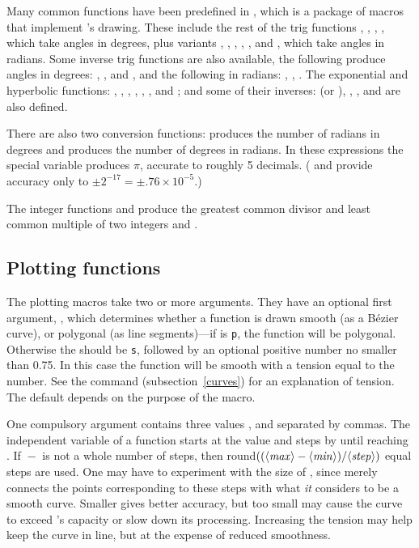 \documentclass[letterpaper]{article}
\begin{document}
Many common functions have been predefined in , which is
a package of \MF{} macros that implement 's drawing. These
include the rest of the trig functions , , ,
, which take angles in degrees, plus variants ,
, , , , and , which take
angles in radians. Some inverse trig functions are also available, the
following produce angles in degrees: , , and
, and the following in radians: , ,
. The exponential and hyperbolic functions: ,
, , , , , and
; and some of their inverses:  (or ),
, , and  are also defined.

There are also two conversion functions:  produces the
number of radians in  degrees and  produces the
number of degrees in  radians. In these expressions the special
variable  produces $\pi$, accurate to roughly 5 decimals.
(\CMF{} and \MP{} provide accuracy only to $\pm2^{-17} = \pm
.76\times10^{-5}$.)

The integer functions  and  produce the
greatest common divisor and least common multiple of two integers
 and .


\subsection{Plotting functions}\label{plotting}

The plotting macros take two or more arguments. They have an optional
first argument, , which determines whether a function is
drawn smooth (as a \MF{} B\'ezier curve), or polygonal (as line
segments)---if  is \texttt{p}, the function will be
polygonal. Otherwise the  should be \texttt{s}, followed by
an optional positive number no smaller than 0.75. In this case the
function will be smooth with a tension equal to the number. See the
 command (subsection~\ref{curves}) for an explanation of
tension. The default  depends on the purpose of the macro.

One compulsory argument contains three values ,  and
 separated by commas.  The independent variable of a function
starts at the value  and steps by  until reaching
. If ${}-{}$ is not a whole number of
steps, then round$((\langle\mbox{\rmfamily\itshape max\/}\rangle-\langle\mbox{\rmfamily\itshape min\/}\rangle)/\langle\mbox{\rmfamily\itshape step\/}\rangle)$ equal steps are
used. One may have to experiment with the size of , since
\MF{} merely connects the points corresponding to these steps with what
\emph{it} considers to be a smooth curve. Smaller  gives
better accuracy, but too small may cause the curve to exceed \MF{}'s
capacity or slow down its processing. Increasing the tension may help
keep the curve in line, but at the expense of reduced smoothness.
\end{document}
